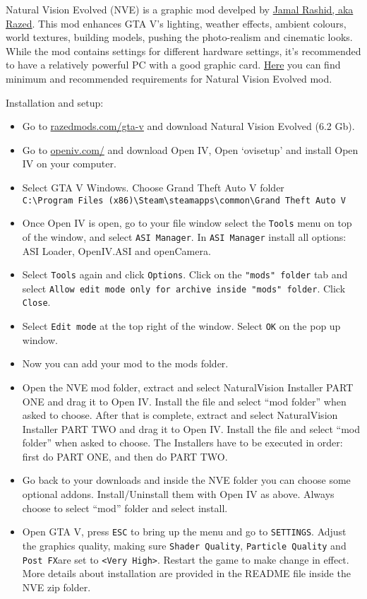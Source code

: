 \documentclass[
  openany]{book}
\begin{document}
Natural Vision Evolved (NVE) is a graphic mod develped by \href{https://www.razedmods.com/}{Jamal Rashid, aka Razed}. This mod enhances GTA V's lighting, weather effects, ambient colours, world textures, building models, pushing the photo-realism and cinematic looks. While the mod contains settings for different hardware settings, it's recommended to have a relatively powerful PC with a good graphic card. \href{https://www.systemrequirementslab.com/cyri/requirements/gta-5-naturalvision-remastered/16594}{Here} you can find minimum and recommended requirements for Natural Vision Evolved mod.

Installation and setup:

\begin{itemize}
\item
  Go to \href{https://www.razedmods.com/gta-v}{razedmods.com/gta-v} and download Natural Vision Evolved (6.2 Gb).
\item
  Go to \href{https://openiv.com/}{openiv.com/} and download Open IV, Open `ovisetup' and install Open IV on your computer.
\item
  Select GTA V Windows. Choose Grand Theft Auto V folder \texttt{C:\textbackslash{}Program\ Files\ (x86)\textbackslash{}Steam\textbackslash{}steamapps\textbackslash{}common\textbackslash{}Grand\ Theft\ Auto\ V}
\item
  Once Open IV is open, go to your file window select the \texttt{Tools} menu on top of the window, and select \texttt{ASI\ Manager}. In \texttt{ASI\ Manager} install all options: ASI Loader, OpenIV.ASI and openCamera.
\item
  Select \texttt{Tools} again and click \texttt{Options}. Click on the \texttt{"mods"\ folder} tab and select \texttt{Allow\ edit\ mode\ only\ for\ archive\ inside\ "mods"\ folder}. Click \texttt{Close}.
\item
  Select \texttt{Edit\ mode} at the top right of the window. Select \texttt{OK} on the pop up window.
\item
  Now you can add your mod to the mods folder.
\item
  Open the NVE mod folder, extract and select NaturalVision Installer PART ONE and drag it to Open IV. Install the file and select ``mod folder'' when asked to choose. After that is complete, extract and select NaturalVision Installer PART TWO and drag it to Open IV. Install the file and select ``mod folder'' when asked to choose. The Installers have to be executed in order: first do PART ONE, and then do PART TWO.
\item
  Go back to your downloads and inside the NVE folder you can choose some optional addons. Install/Uninstall them with Open IV as above. Always choose to select ``mod'' folder and select install.
\item
  Open GTA V, press \texttt{ESC} to bring up the menu and go to \texttt{SETTINGS}. Adjust the graphics quality, making sure \texttt{Shader\ Quality}, \texttt{Particle\ Quality} and \texttt{Post\ FX}are set to \texttt{\textless{}Very\ High\textgreater{}}. Restart the game to make change in effect. More details about installation are provided in the README file inside the NVE zip folder.
\end{itemize}
\end{document}
